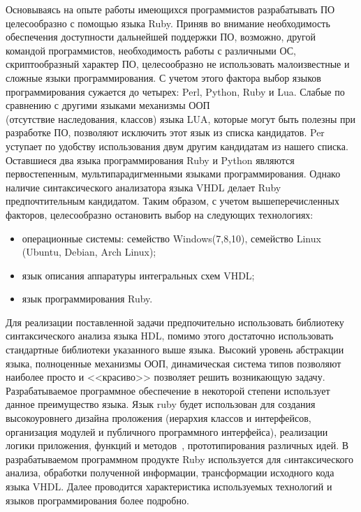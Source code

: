 Основываясь на опыте работы имеющихся программистов разрабатывать ПО целесообразно с помощью языка Ruby.
Приняв во внимание необходимость обеспечения доступности дальнейшей поддержки ПО, возможно, другой командой программистов, необходимость работы с различными ОС, скриптообразный характер ПО, целесообразно не использовать малоизвестные и сложные языки программирования.
С учетом этого фактора выбор языков программирования сужается до четырех: Perl, Python, Ruby и Lua.
Слабые по сравнению с другими языками механизмы ООП\\(отсутствие наследования, классов) языка LUA, которые могут быть полезны при разработке ПО, позволяют исключить этот язык из списка кандидатов.
Per уступает по удобству использования двум другим кандидатам из нашего списка.
Оставшиеся два языка программирования Ruby и Python являются первостепенным, мультипарадигменными языками программирования. Однако наличие синтаксического анализатора языка VHDL делает
Ruby предпочтительным кандидатом.
Таким образом, с учетом вышеперечисленных факторов, целесообразно остановить выбор на следующих технологиях:
\begin{itemize}
  \item операционные системы: семейство Windows(7,8,10), семейство Linux\\(Ubuntu, Debian, Arch Linux);
  \item язык описания аппаратуры интегральных схем VHDL;
  \item язык программирования Ruby.
\end{itemize}
Для реализации поставленной задачи предпочительно использовать библиотеку синтаксического анализа языка HDL, помимо этого достаточно использовать стандартные библиотеки указанного выше языка.
Высокий уровень абстракции языка, полноценные механизмы ООП, динамическая система типов позволяют наиболее просто и <<красиво>> позволяет решить возникающую задачу.
Разрабатываемое программное обеспечение в некоторой степени использует данное преимущество языка.
Язык ruby будет использован для создания высокоуровнего дизайна проложения (иерархия классов и интерфейсов, организация модулей и публичного программного интерфейса), реализации логики приложения, функций и методов~\cite{dpir_2007}, прототипирования различных идей.
В разрабатываемом программном продукте Ruby используется для cинтаксического анализа, обработки полученной информации, трансформации исходного кода языка VHDL.
Далее проводится характеристика используемых технологий и языков программирования более подробно.


